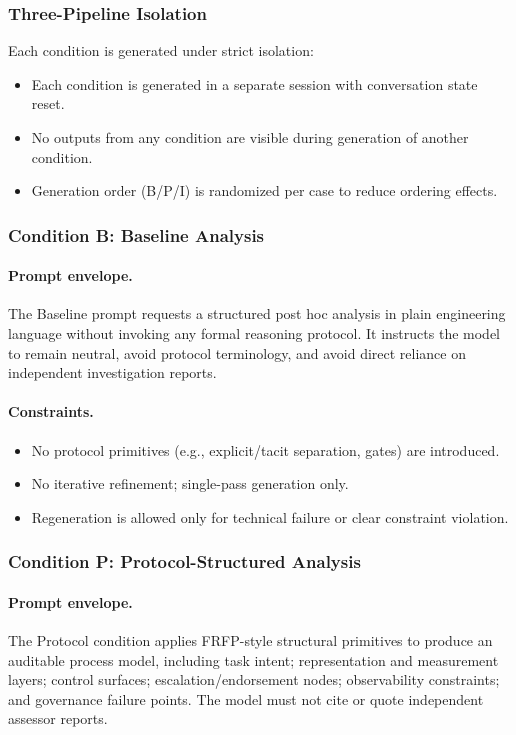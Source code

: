 \subsubsection{Three-Pipeline Isolation}

Each condition is generated under strict isolation:
\begin{itemize}
    \item Each condition is generated in a separate session with conversation state reset.
    \item No outputs from any condition are visible during generation of another condition.
    \item Generation order (B/P/I) is randomized per case to reduce ordering effects.
\end{itemize}

\subsubsection{Condition B: Baseline Analysis}

\paragraph{Prompt envelope.}
The Baseline prompt requests a structured post hoc analysis in plain engineering language without invoking any formal reasoning protocol. It instructs the model to remain neutral, avoid protocol terminology, and avoid direct reliance on independent investigation reports.

\paragraph{Constraints.}
\begin{itemize}
    \item No protocol primitives (e.g., explicit/tacit separation, gates) are introduced.
    \item No iterative refinement; single-pass generation only.
    \item Regeneration is allowed only for technical failure or clear constraint violation.
\end{itemize}

\subsubsection{Condition P: Protocol-Structured Analysis}

\paragraph{Prompt envelope.}
The Protocol condition applies FRFP-style structural primitives to produce an auditable process model,
including task intent; representation and measurement layers; control surfaces; escalation/endorsement nodes;
observability constraints; and governance failure points. The model must not cite or quote independent assessor
reports. 

